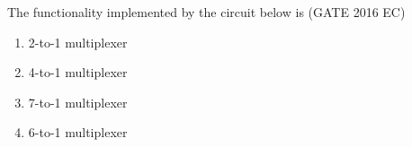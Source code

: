 \begin{enumerate}
The functionality implemented by the circuit below is \hfill{(GATE 2016 EC)}

\begin{figure}[!ht]
\centering

\label{fig:gate_ec_2016_43}
\end{figure}

\begin{enumerate}[label=\Alph*.]
\item 2-to-1 multiplexer
\item 4-to-1 multiplexer
\item 7-to-1 multiplexer
\item 6-to-1 multiplexer
\end{enumerate}

\end{enumerate}


